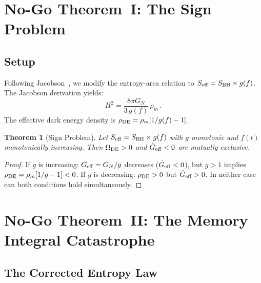 \documentclass[12pt,a4paper]{article}
\newtheorem{theorem}{Theorem}
\theoremstyle{remark}
\begin{document}
\section{No-Go Theorem~I: The Sign Problem}

\subsection{Setup}

Following Jacobson~\cite{Jacobson1995}, we modify the entropy-area relation to $S_{\rm eff} = S_{\rm BH}\times g(f)$.
The Jacobson derivation yields:
\begin{equation}
H^2 = \frac{8\pi G_N}{3\,g(f)}\,\rho_m\,.
\end{equation}
The effective dark energy density is $\rho_{\rm DE} = \rho_m[1/g(f) - 1]$.

\begin{theorem}[Sign Problem]\label{thm:sign}
Let $S_{\rm eff} = S_{\rm BH}\times g(f)$ with $g$ monotonic and $f(t)$ monotonically increasing.
Then $\Omega_{\rm DE} > 0$ and $\dot G_{\rm eff} < 0$ are mutually exclusive.
\end{theorem}

\begin{proof}
If $g$ is increasing: $G_{\rm eff} = G_N/g$ decreases ($\dot G_{\rm eff}<0$), but $g>1$ implies $\rho_{\rm DE} = \rho_m[1/g-1] < 0$.
If $g$ is decreasing: $\rho_{\rm DE}>0$ but $\dot G_{\rm eff}>0$.
In neither case can both conditions hold simultaneously.
\end{proof}


\section{No-Go Theorem~II: The Memory Integral Catastrophe}

\subsection{The Corrected Entropy Law}
\end{document}

